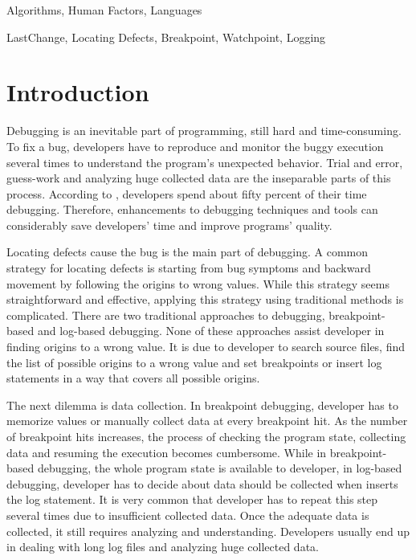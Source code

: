 \documentclass[preprint]{sigplanconf}
\begin{document}

\terms
Algorithms, Human Factors, Languages

\keywords
LastChange, Locating Defects, Breakpoint, Watchpoint, Logging

\section{Introduction}
Debugging is an inevitable part of programming, still hard and time-consuming. To fix a bug, developers have to reproduce and monitor the buggy execution several times to understand the program's unexpected behavior. Trial and error, guess-work and analyzing huge collected data are the inseparable parts of this process. According to \cite{LaToza}, developers spend about fifty percent of their time debugging. Therefore, enhancements to debugging techniques and tools can considerably save developers' time and improve programs' quality.

Locating defects cause the bug is the main part of debugging. A common strategy for locating defects is starting from bug symptoms and backward movement by following the origins to wrong values. While this strategy seems straightforward and effective, applying this strategy using traditional methods is complicated. There are two traditional approaches to debugging, breakpoint-based and log-based debugging. None of these approaches assist developer in finding origins to a wrong value. It is due to developer to search source files, find the list of possible origins to a wrong value and set breakpoints or insert log statements in a way that covers all possible origins.

The next dilemma is data collection. In breakpoint debugging,
developer has to memorize values or manually collect data at every
breakpoint hit. As the number of breakpoint hits increases, the
process of checking the program state, collecting data and resuming
the execution becomes cumbersome. While in breakpoint-based debugging,
the whole program state is available to developer, in log-based
debugging, developer has to decide about data should be collected when
inserts the log statement. It is very common that developer has to
repeat this step several times due to insufficient collected
data. Once the adequate data is collected, it still requires analyzing
and understanding. Developers usually end up in dealing with long log
files and analyzing huge collected data.
\end{document}
